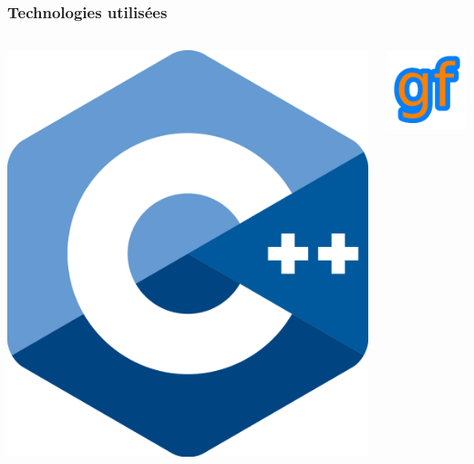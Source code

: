 \documentclass{beamer}
\begin{document}
\begin{frame}
    \frametitle{Technologies utilisées}
    \begin{columns}
        \centering
        \includegraphics[width=\textwidth]{images/cpp.png} 
    
        \centering
        \includegraphics[width=\textwidth]{images/GF.png}


\end{columns}
\end{frame}
\end{document}

